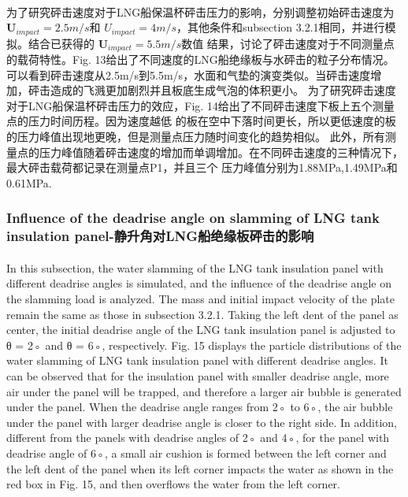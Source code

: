 \documentclass[UTF8]{ctexart}
\begin{document}
\paragraph{\quad}为了研究砰击速度对于LNG船保温杯砰击压力的影响，分别调整初始砰击速度为 $\mathbf{U}_{impact} = 2.5m/s$和 
                $U_{impact} = 4m/s$，其他条件和subsection 3.2.1相同，并进行模拟。结合已获得的 $\mathbf{U}_{impact} = 5.5m/s$数值
                结果，讨论了砰击速度对于不同测量点的载荷特性。Fig. 13给出了不同速度的LNG船绝缘板与水砰击的粒子分布情况。
                可以看到砰击速度从2.5m/s到5.5m/s，水面和气垫的演变类似。当砰击速度增加，砰击造成的飞溅更加剧烈并且板底生成气泡的体积更小。
                为了研究砰击速度对于LNG船保温杯砰击压力的效应，Fig. 14给出了不同砰击速度下板上五个测量点的压力时间历程。因为速度越低
                的板在空中下落时间更长，所以更低速度的板的压力峰值出现地更晚，但是测量点压力随时间变化的趋势相似。
                此外，所有测量点的压力峰值随着砰击速度的增加而单调增加。在不同砰击速度的三种情况下，最大砰击载荷都记录在测量点P1，并且三个
                压力峰值分别为1.88MPa,1.49MPa和0.61MPa.

\subsubsection{Influence of the deadrise angle on slamming of LNG tank insulation panel-静升角对LNG船绝缘板砰击的影响}
\paragraph{\quad}In this subsection, the water slamming of the LNG tank insulation panel with different 
                deadrise angles is simulated, and the influence of the deadrise angle on the slamming load is analyzed. 
                The mass and initial impact velocity of the plate remain the same as those in subsection 3.2.1. Taking 
                the left dent of the panel as center, the initial deadrise angle of the LNG tank insulation panel is 
                adjusted to θ = 2◦ and θ = 6◦, respectively. Fig. 15 displays the particle distributions of the water 
                slamming of LNG tank insulation panel with different deadrise angles. It can be observed that for the 
                insulation panel with smaller deadrise angle, more air under the panel will be trapped, and therefore a 
                larger air bubble is generated under the panel. When the deadrise angle ranges from 2◦ to 6◦, the air bubble 
                under the panel with larger deadrise angle is closer to the right side. In addition, different from the panels 
                with deadrise angles of 2◦ and 4◦, for the panel with deadrise angle of 6◦, a small air cushion is formed 
                between the left corner and the left dent of the panel when its left corner impacts the water as shown in 
                the red box in Fig. 15, and then overflows the water from the left corner.
\end{document}
